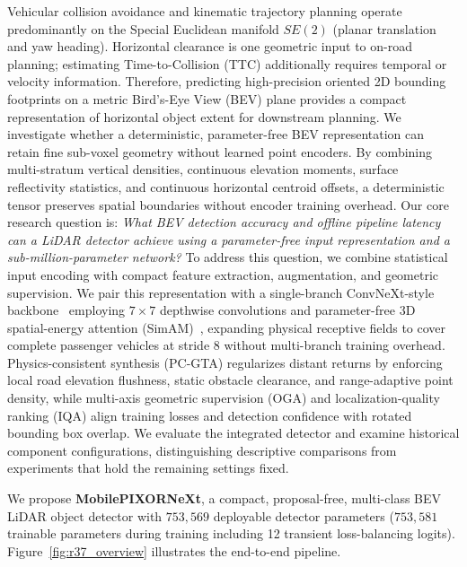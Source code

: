 Vehicular collision avoidance and kinematic trajectory planning operate predominantly on the Special Euclidean manifold $SE(2)$ (planar translation and yaw heading). Horizontal clearance is one geometric input to on-road planning; estimating Time-to-Collision (TTC) additionally requires temporal or velocity information. Therefore, predicting high-precision oriented 2D bounding footprints on a metric Bird's-Eye View (BEV) plane provides a compact representation of horizontal object extent for downstream planning. We investigate whether a deterministic, parameter-free BEV representation can retain fine sub-voxel geometry without learned point encoders. By combining multi-stratum vertical densities, continuous elevation moments, surface reflectivity statistics, and continuous horizontal centroid offsets, a deterministic tensor preserves spatial boundaries without encoder training overhead. Our core research question is: \textit{What BEV detection accuracy and offline pipeline latency can a LiDAR detector achieve using a parameter-free input representation and a sub-million-parameter network?} To address this question, we combine statistical input encoding with compact feature extraction, augmentation, and geometric supervision. We pair this representation with a single-branch ConvNeXt-style backbone~\cite{liu2022convnext} employing $7 \times 7$ depthwise convolutions and parameter-free 3D spatial-energy attention (SimAM)~\cite{yang2021simam}, expanding physical receptive fields to cover complete passenger vehicles at stride 8 without multi-branch training overhead. Physics-consistent synthesis (PC-GTA) regularizes distant returns by enforcing local road elevation flushness, static obstacle clearance, and range-adaptive point density, while multi-axis geometric supervision (OGA) and localization-quality ranking (IQA) align training losses and detection confidence with rotated bounding box overlap. We evaluate the integrated detector and examine historical component configurations, distinguishing descriptive comparisons from experiments that hold the remaining settings fixed.

We propose \textbf{MobilePIXORNeXt}, a compact, proposal-free, multi-class BEV LiDAR object detector with $753{,}569$ deployable detector parameters ($753{,}581$ trainable parameters during training including 12 transient loss-balancing logits). Figure~\ref{fig:r37_overview} illustrates the end-to-end pipeline.

